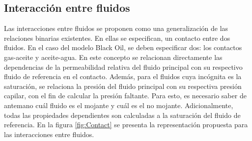 \subsection{Interacción entre fluidos}\label{sec:PS_Interphase}
%

Las interacciones entre fluidos se proponen como una generalización de las relaciones binarias existentes. En ellas se especifican, un contacto entre dos fluidos. En el caso del modelo Black Oil, se deben especificar dos: los contactos gas-aceite y aceite-agua. En este concepto se relacionan directamente las dependencias de la permeabilidad relativa del fluido principal con su respectivo fluido de referencia en el contacto. Además, para el fluidos cuya incógnita es la saturación, se relaciona la presión del fluido principal con su respectiva presión capilar, con el fin de calcular la presión faltante. Para esto, es necesario saber de antemano cuál fluido es el mojante y cuál es el no mojante. Adicionalmente, todas las propiedades dependientes son calculadas a la saturación del fluido de referencia. En la figura \ref{fig:Contact} se presenta la representación propuesta para las interacciones entre fluidos.

